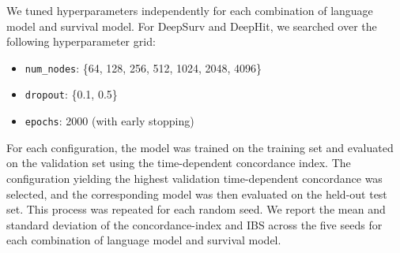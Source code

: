 We tuned hyperparameters independently for each combination of language model and survival model. 
For DeepSurv and DeepHit, we searched over the following hyperparameter grid:
\begin{itemize}[leftmargin=*,topsep=0pt,itemsep=0pt]
    \item \texttt{num\_nodes}: \{64, 128, 256, 512, 1024, 2048, 4096\}
    \item \texttt{dropout}: \{0.1, 0.5\}
    \item \texttt{epochs}: 2000 (with early stopping)
\end{itemize}

For each configuration, the model was trained on the training set and evaluated on the validation set using the time-dependent concordance index. 
The configuration yielding the highest validation time-dependent concordance was selected, and the corresponding model was then evaluated on the held-out test set. 
This process was repeated for each random seed.
We report the mean and standard deviation of the concordance-index and IBS across the five seeds for each combination of language model and survival model. 


